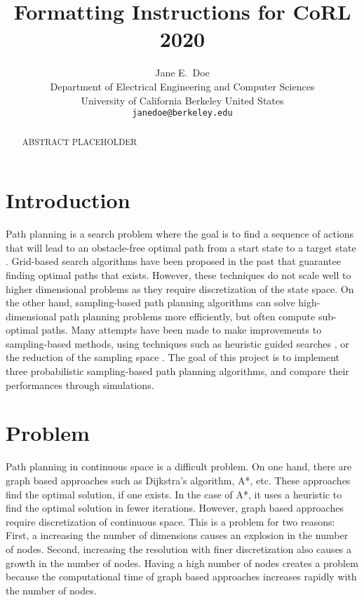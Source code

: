 \documentclass{article}
\title{Formatting Instructions for CoRL 2020}
\author{
  Jane E.~Doe\\
  Department of Electrical Engineering and Computer Sciences\\
  University of California Berkeley 
  United States\\
  \texttt{janedoe@berkeley.edu} \\
}
\begin{document}
\maketitle


\begin{abstract}
    ABSTRACT PLACEHOLDER
\end{abstract}



\section{Introduction}
    Path planning is a search problem where the goal is to find a sequence of actions that will lead to an obstacle-free optimal path from a start state to a target state \cite{pathplan}. Grid-based search algorithms have been proposed in the past \cite{astar} \cite{dstar} that guarantee finding optimal paths that exists. However, these techniques do not scale well to higher dimensional problems as they require discretization of the state space. On the other hand, sampling-based path planning algorithms \cite{rrt} \cite{prm} can solve high-dimensional path planning problems more efficiently, but often compute sub-optimal paths. Many attempts have been made to make improvements to sampling-based methods, using techniques such as heuristic guided searches \cite{irrt}, or the reduction of the sampling space \cite{astar-rrt}. The goal of this project is to implement three probabilistic sampling-based path planning algorithms, and compare their performances through simulations.

\section{Problem}
\label{sec:Problem}

    Path planning in continuous space is a difficult problem. On one hand, there are graph based approaches such as Dijkstra's algorithm, A*, etc. These approaches find the optimal solution, if one exists. In the case of A*, it uses a heuristic to find the optimal solution in fewer iterations. However, graph based approaches require discretization of continuous space. This is a problem for two reasons: First, a increasing the number of dimensions causes an explosion in the number of nodes. Second, increasing the resolution with finer discretization also causes a growth in the number of nodes. Having a high number of nodes creates a problem because the computational time of graph based approaches increases rapidly with the number of nodes.
\end{document}
